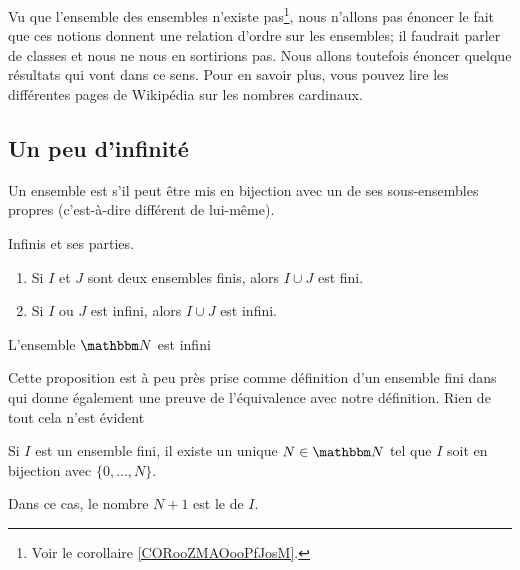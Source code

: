 Vu que l'ensemble des ensembles n'existe pas\footnote{Voir le corollaire \ref{CORooZMAOooPfJosM}.}, nous n'allons pas énoncer le fait que ces notions donnent une relation d'ordre sur les ensembles; il faudrait parler de classes et nous ne nous en sortirions pas. Nous allons toutefois énoncer quelque résultats qui vont dans ce sens. Pour en savoir plus, vous pouvez lire les différentes pages de Wikipédia sur les nombres cardinaux.

\subsection{Un peu d'infinité}

\begin{definition}      \label{DefEOZLooUMCzZR}
    Un ensemble est  s'il peut être mis en bijection avec un de ses sous-ensembles propres (c'est-à-dire différent de lui-même).
\end{definition}

\begin{lemma}       \label{LEMooYHGCooAwsVQN}
    Infinis et ses parties.
    \begin{enumerate}
        \item
            Si \( I\) et \( J\) sont deux ensembles finis, alors \( I\cup J\) est fini.
        \item
            Si \( I\) ou \( J\) est infini, alors \( I \cup J\) est infini.
    \end{enumerate}
\end{lemma}

\begin{proposition}     \label{PROPooBYKCooGDkfWy}
    L'ensemble \( \eN\) est infini
\end{proposition}

Cette proposition est à peu près prise comme définition d'un ensemble fini dans \cite{ooVAYLooJxVYex} qui donne également une preuve de l'équivalence avec notre définition. Rien de tout cela n'est évident
\begin{propositionDef}     \label{PROPooJLGKooDCcnWi}
    Si \( I\) est un ensemble fini, il existe un unique \( N\in \eN\) tel que \( I\) soit en bijection avec \( \{ 0,\ldots, N \}\).

    Dans ce cas, le nombre \( N+1\) est le  de \( I\). 
\end{propositionDef}

